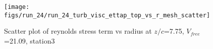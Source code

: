 \begin{figure}[H]
\centering
\texttt{[image: figs/run\_24/run\_24\_turb\_visc\_ettap\_top\_vs\_r\_mesh\_scatter]}
\caption{Scatter plot of reynolds stress term vs radius at $z/c$=7.75, $V_{free}$=21.09, station3}
\label{fig:run_24_turb_visc_ettap_top_vs_r_mesh_scatter}
\end{figure}


